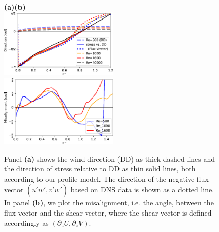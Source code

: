 \documentclass[smallcondensed,final]{svjour3}
\newcommand{\p}{\partial}
\begin{document}
\begin{figure}
  \textbf{(a)\hspace{0.48\textwidth}(b)}\\[-0.15em]
  \includegraphics[width=0.5\textwidth]{Fig13a.eps} %
  \includegraphics[width=0.5\textwidth]{Fig13b.eps} %
  \caption{Panel \textbf{(a)} shows the wind direction (DD) as thick dashed lines and the direction of stress relative to DD as thin solid lines, both according to our profile model. The direction of the negative flux vector $(\overline{u'w'},\overline{v'w'})$ based on DNS data is shown as a dotted line. In panel \textbf{(b)}, we plot the misalignment, i.e. the angle, between the flux vector and the shear vector, where the shear vector is defined accordingly as $(\p_z U, \p_z V)$.} 
  \label{fig:alignment}
\end{figure}


%
\par%
%

%
%
\end{document}
